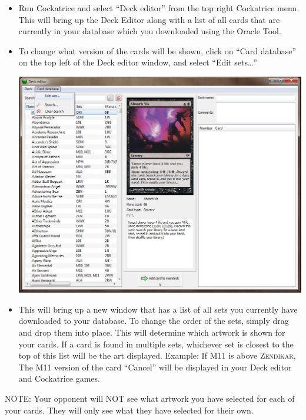 \documentclass[a4paper]{scrbook}
\begin{document}
\begin{itemize}
 \item Run Cockatrice and select “Deck editor” from the top right Cockatrice menu. This will bring up the Deck Editor along with a list of all cards that are currently in your database which you downloaded using the Oracle Tool.
 \item To change what version of the cards will be shown, click on “Card database” on the top left of the Deck editor window, and select “Edit sets…”
  \begin{center}
\includegraphics[scale=0.55]{pics/fetchf924}
 \end{center}
 \item This will bring up a new window that has a list of all sets you currently have downloaded to your database. To change the order of the sets, simply drag and drop them into place.
 This will determine which artwork is shown for your cards. If a card is found in multiple sets, whichever set is closest to the top of this list will be the art displayed.
 Example: If \textsc{M11} is above \textsc{Zendikar}, The M11 version of the card “Cancel” will be displayed in your Deck editor and Cockatrice games.
\end{itemize}
NOTE: Your opponent will NOT see what artwork you have selected for each of your cards. They will only see what they have selected for their own. 
\end{document}
